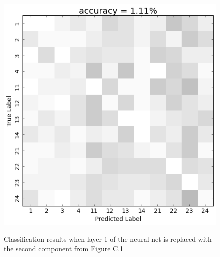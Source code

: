 \begin{figure}[htbp] 
  \begin{center}
    \includegraphics[scale=0.5]{Figures/PC1_confusion}
   \\\vspace{-0.8em}
    \caption{Classification results when layer 1 of the neural net is replaced with the second component from Figure C.1}
    \label{fig:PC1_confusion}
  \end{center}
\end{figure}
